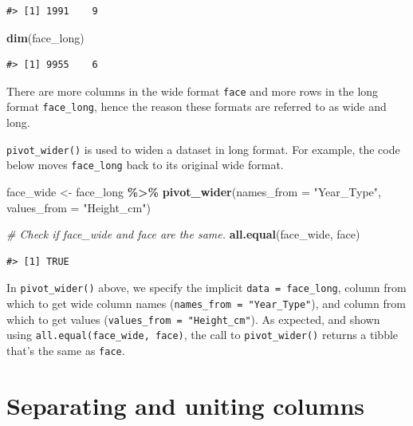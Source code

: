 \documentclass[
  11pt,
]{krantz}
\newenvironment{Shaded}{\begin{snugshade}}{\end{snugshade}}
\newcommand{\CommentTok}[1]{\textcolor[rgb]{0.56,0.35,0.01}{\textit{#1}}}
\newcommand{\DataTypeTok}[1]{\textcolor[rgb]{0.13,0.29,0.53}{#1}}
\newcommand{\KeywordTok}[1]{\textcolor[rgb]{0.13,0.29,0.53}{\textbf{#1}}}
\newcommand{\NormalTok}[1]{#1}
\newcommand{\OperatorTok}[1]{\textcolor[rgb]{0.81,0.36,0.00}{\textbf{#1}}}
\newcommand{\StringTok}[1]{\textcolor[rgb]{0.31,0.60,0.02}{#1}}
\theoremstyle{definition}
\theoremstyle{definition}
\theoremstyle{definition}
\theoremstyle{definition}
\theoremstyle{remark}
\begin{document}
\begin{verbatim}
#> [1] 1991    9
\end{verbatim}

\begin{Shaded}
\begin{Highlighting}[]
\KeywordTok{dim}\NormalTok{(face\_long)}
\end{Highlighting}
\end{Shaded}

\begin{verbatim}
#> [1] 9955    6
\end{verbatim}

There are more columns in the wide format \texttt{face} and more rows in the long format \texttt{face\_long}, hence the reason these formats are referred to as wide and long.

\texttt{pivot\_wider()} is used to widen a dataset in long format. For example, the code below moves \texttt{face\_long} back to its original wide format.

\begin{Shaded}
\begin{Highlighting}[]
\NormalTok{face\_wide \textless{}{-}}\StringTok{ }\NormalTok{face\_long }\OperatorTok{\%\textgreater{}\%}\StringTok{ }\KeywordTok{pivot\_wider}\NormalTok{(}\DataTypeTok{names\_from =} \StringTok{"Year\_Type"}\NormalTok{,}
          \DataTypeTok{values\_from =} \StringTok{"Height\_cm"}\NormalTok{)}

\CommentTok{\# Check if face\_wide and face are the same.}
\KeywordTok{all.equal}\NormalTok{(face\_wide, face)}
\end{Highlighting}
\end{Shaded}

\begin{verbatim}
#> [1] TRUE
\end{verbatim}

In \texttt{pivot\_wider()} above, we specify the implicit \texttt{data\ =\ face\_long}, column from which to get wide column names (\texttt{names\_from\ =\ "Year\_Type"}), and column from which to get values (\texttt{values\_from\ =\ "Height\_cm"}). As expected, and shown using \texttt{all.equal(face\_wide,\ face)}, the call to \texttt{pivot\_wider()} returns a tibble that's the same as \texttt{face}.

\hypertarget{tidyrSeparate}{%
\section{Separating and uniting columns}\label{tidyrSeparate}}
\end{document}
